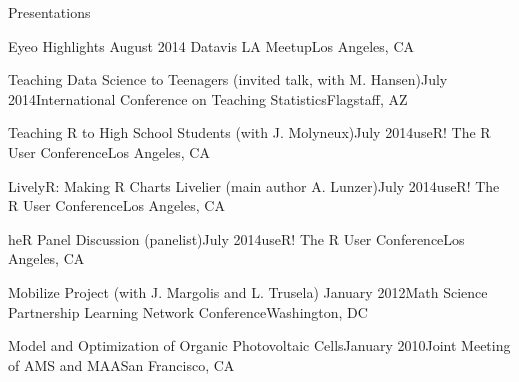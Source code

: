 \documentclass{resume} %
\begin{document}
\begin{rSection}{Presentations}
\begin{sSubsection}{Eyeo Highlights}{ }{August 2014 }{Datavis LA Meetup}{Los Angeles, CA}
\end{sSubsection}

\begin{sSubsection}{Teaching Data Science to Teenagers}{ (invited talk, with M. Hansen)}{July 2014}{International Conference on Teaching Statistics}{Flagstaff, AZ}
\end{sSubsection}

\begin{sSubsection}{Teaching R to High School Students}{ (with J. Molyneux)}{July 2014}{useR! The R User Conference}{Los Angeles, CA}
\end{sSubsection}

\begin{sSubsection}{LivelyR: Making R Charts Livelier}{ (main author A. Lunzer)}{July 2014}{useR! The R User Conference}{Los Angeles, CA}
\end{sSubsection}

\begin{sSubsection}{heR Panel Discussion}{ (panelist)}{July 2014}{useR! The R User Conference}{Los Angeles, CA}
\end{sSubsection}

\begin{sSubsection}{Mobilize Project}{ (with J. Margolis and L. Trusela)} {January 2012}{Math Science Partnership Learning Network Conference}{Washington, DC}
\end{sSubsection}

\begin{sSubsection}{Model and Optimization of Organic Photovoltaic Cells}{}{January 2010}{Joint Meeting of AMS and MAA}{San Francisco, CA}
\end{sSubsection}
\end{rSection}
\end{document}
